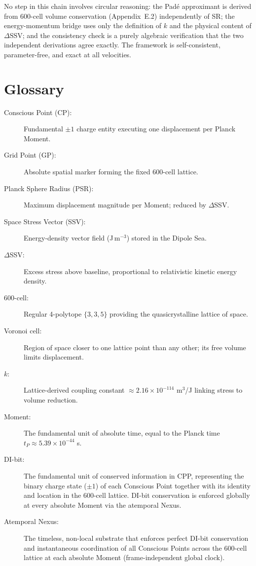 \documentclass[11pt,letterpaper]{article}
\begin{document}
No step in this chain involves circular reasoning: the Padé 
approximant is derived from 600-cell volume conservation 
(Appendix~E.2) independently of SR; the energy-momentum bridge 
uses only the definition of $k$ and the physical content of 
$\Delta\text{SSV}$; and the consistency check is a purely algebraic verification that the two independent derivations agree exactly. 
The framework is self-consistent, parameter-free, and exact at all velocities.


\section{Glossary}

\begin{description}

\item[Conscious Point (CP):] Fundamental $\pm 1$ charge entity executing one displacement per Planck Moment.

\item[Grid Point (GP):] Absolute spatial marker forming the fixed 600-cell lattice.

\item[Planck Sphere Radius (PSR):] Maximum displacement magnitude per Moment; reduced by $\Delta$SSV.

\item[Space Stress Vector (SSV):] Energy-density vector field (J\,m$^{-3}$) stored in the Dipole Sea.

\item[$\Delta$SSV:] Excess stress above baseline, proportional to relativistic kinetic energy density.

\item[600-cell:] Regular 4-polytope $\{3,3,5\}$ providing the quasicrystalline lattice of space.

\item[Voronoi cell:] Region of space closer to one lattice point than any other; its free volume limits displacement.

\item[{$k$}:] Lattice-derived coupling constant $\approx 2.16 \times 10^{-114}$ m$^3$/J linking stress to volume reduction.

\item[Moment:] The fundamental unit of absolute time, equal to the Planck time $t_P \approx 5.39 \times 10^{-44}$ s.

\item[DI-bit:] The fundamental unit of conserved information in CPP, representing the binary charge state ($\pm 1$) of each Conscious Point together with its identity and location in the 600-cell lattice. DI-bit conservation is enforced globally at every absolute Moment via the atemporal Nexus.

\item[Atemporal Nexus:] The timeless, non-local substrate that enforces perfect DI-bit conservation and instantaneous coordination of all Conscious Points across the 600-cell lattice at each absolute Moment (frame-independent global clock).

\end{description}
\end{document}
